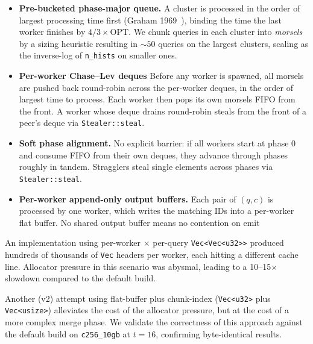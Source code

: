 \begin{itemize}
    \item \textbf{Pre-bucketed phase-major queue.} A cluster is processed in the order of largest processing time first (Graham 1969~\cite{graham_1969}), binding the time the last worker finishes by $4/3 \times \text{OPT}$. We chunk queries in each cluster into \emph{morsels} by a sizing heuristic resulting in $\sim\!50$ queries on the largest clusters, scaling as the inverse-log of \texttt{n\_hists} on smaller ones.
    \item \textbf{Per-worker Chase--Lev deques} Before any worker is spawned, all morsels are pushed back round-robin across the per-worker deques, in the order of largest time to process. Each worker then pops its own morsels FIFO from the front. A worker whose deque drains round-robin steals from the front of a peer's deque via \texttt{Stealer::steal}. 
    \item \textbf{Soft phase alignment.} No explicit barrier: if all workers start at phase $0$ and consume FIFO from their own deques, they advance through phases roughly in tandem. Stragglers steal single elements across phases via \texttt{Stealer::steal}.
    \item \textbf{Per-worker append-only output buffers.} Each pair of $(q,c)$ is processed by one worker, which writes the matching IDs into a per-worker flat buffer. No shared output buffer means no contention on emit
\end{itemize}

An implementation using per-worker $\times$ per-query \texttt{Vec<Vec<u32>>} produced hundreds of thousands of \texttt{Vec} headers per worker, each hitting a different cache line. Allocator pressure in this scenario was abysmal, leading to a 10--15$\times$ slowdown compared to the default build. 

Another (v2) attempt using flat-buffer plus chunk-index (\texttt{Vec<u32>} plus \texttt{Vec<usize>}) alleviates the cost of the allocator pressure, but at the cost of a more complex merge phase. We validate the correctness of this approach against the default build on \texttt{c256\_10gb} at $t{=}16$, confirming byte-identical results.

